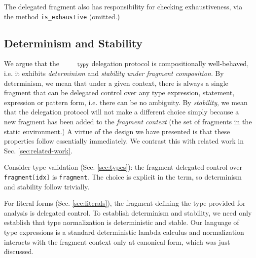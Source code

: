 \documentclass[10pt]{sigplanconf}
\newcommand{\typy}{\texttt{\footnotesize typy}}
\newcommand{\lip}[1]{\lstinline[language=Python,basicstyle=\ttfamily\footnotesize,morekeywords={with},deletendkeywords={tuple,buffer,map}]{#1}}
\newcommand{\li}[1]{\lip{#1}}
\begin{document}
The delegated fragment also has responsibility for checking exhaustiveness, via the method \li{is_exhaustive} (omitted.) %

\subsection{Determinism and Stability}
We argue that the $\typy$ delegation protocol is compositionally well-behaved, i.e. it exhibits \emph{determinism} and \emph{stability under fragment composition}. By {determinism}, we mean that under a given context, there is always a single fragment that can be delegated control over any type expression, statement, expression or pattern form, i.e. there can be no ambiguity. By \emph{stability}, we mean that the delegation protocol will not make a different choice simply because a new fragment has been added to the \emph{fragment context} (the set of fragments in the static environment.) A virtue of the design we have presented is that these properties follow essentially immediately. We contrast this with related work in Sec. \ref{sec:related-work}.%


Consider type validation (Sec. \ref{sec:types}): the fragment delegated control over \li{fragment[idx]} is \li{fragment}. The choice is explicit in the term, so determinism and stability follow trivially.

For literal forms (Sec. \ref{sec:literals}), the fragment defining the type provided for analysis is delegated control. To establish determinism and stability, we need only establish that type normalization is deterministic and stable. Our language of type expressions is a standard deterministic lambda calculus \cite{DBLP:conf/lfmtp/Crary09} and normalization interacts with the fragment context only at canonical form, which was just discussed.

\end{document}
